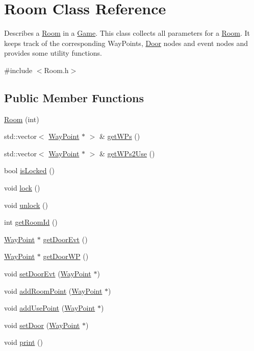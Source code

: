 \hypertarget{classRoom}{\section{\-Room \-Class \-Reference}
\label{classRoom}
}


\-Describes a \hyperlink{classRoom}{\-Room} in a \hyperlink{classGame}{\-Game}. \-This class collects all parameters for a \hyperlink{classRoom}{\-Room}. \-It keeps track of the corresponding \-Way\-Points, \hyperlink{classDoor}{\-Door} nodes and event nodes and provides some utility functions.  




{\ttfamily \#include $<$\-Room.\-h$>$}

\subsection*{\-Public \-Member \-Functions}
\begin{DoxyCompactItemize}
\item 
\hyperlink{classRoom_aeca494ef2b98b46ab80620ddda354bdb}{\-Room} (int)
\item 
std\-::vector$<$ \hyperlink{classWayPoint}{\-Way\-Point} $\ast$ $>$ \& \hyperlink{classRoom_a8ada2aba11643989125c52056f21fdfb}{get\-W\-Ps} ()
\item 
std\-::vector$<$ \hyperlink{classWayPoint}{\-Way\-Point} $\ast$ $>$ \& \hyperlink{classRoom_a969be8dbe4444e7be92b4107337c8109}{get\-W\-Ps2\-Use} ()
\item 
bool \hyperlink{classRoom_adc25ce4a3d509baf2d74ce4feaadcfbd}{is\-Locked} ()
\item 
void \hyperlink{classRoom_a90ca4dec3d3040ac2ab9558da6bd024a}{lock} ()
\item 
void \hyperlink{classRoom_a58285cba499484ecbbdba37e81b7205f}{unlock} ()
\item 
int \hyperlink{classRoom_a2d9554ac5bb8f261fd38238eab0e6f02}{get\-Room\-Id} ()
\item 
\hyperlink{classWayPoint}{\-Way\-Point} $\ast$ \hyperlink{classRoom_a289489d94ab8471aa9213e57f31fdbfd}{get\-Door\-Evt} ()
\item 
\hyperlink{classWayPoint}{\-Way\-Point} $\ast$ \hyperlink{classRoom_a2a5c4f4ebb5fab1f30c7ef2507352269}{get\-Door\-W\-P} ()
\item 
void \hyperlink{classRoom_af7a4019ac279db263ac1aaa3daeb6452}{set\-Door\-Evt} (\hyperlink{classWayPoint}{\-Way\-Point} $\ast$)
\item 
void \hyperlink{classRoom_a0969d7fef8ee5df46f4f7f092356e727}{add\-Room\-Point} (\hyperlink{classWayPoint}{\-Way\-Point} $\ast$)
\item 
void \hyperlink{classRoom_add8ba3c88fb1d25e5e7ef45871de33d1}{add\-Use\-Point} (\hyperlink{classWayPoint}{\-Way\-Point} $\ast$)
\item 
void \hyperlink{classRoom_a1a07570c9de0f1830b54378daea77107}{set\-Door} (\hyperlink{classWayPoint}{\-Way\-Point} $\ast$)
\item 
void \hyperlink{classRoom_a8d4ac41b692d89e589b695b53b8cb8f6}{print} ()
\end{DoxyCompactItemize}
